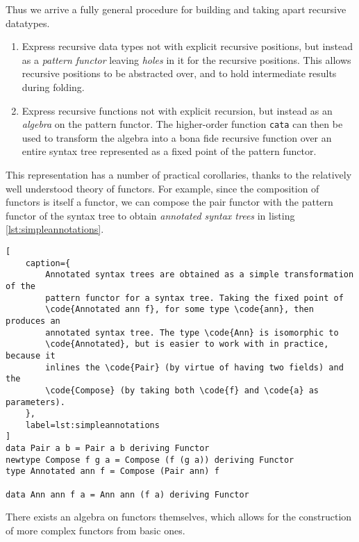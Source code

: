 \documentclass[letterpaper,11pt]{article}
\newcommand{\code}{\texttt}
\begin{document}
Thus we arrive a fully general procedure for building and taking apart
recursive datatypes.

\begin{enumerate}
    \item
        Express recursive data types not with explicit recursive positions, but
        instead as a \emph{pattern functor} leaving \emph{holes} in it for the
        recursive positions. This allows recursive positions to be abstracted
        over, and to hold intermediate results during folding.

    \item
        Express recursive functions not with explicit recursion, but instead as
        an \emph{algebra} on the pattern functor. The higher-order function
        \code{cata} can then be used to transform the algebra into a bona fide
        recursive function over an entire syntax tree represented as a fixed
        point of the pattern functor.
\end{enumerate}

This representation has a number of practical corollaries, thanks to the
relatively well understood theory of functors. For example, since the
composition of functors is itself a functor, we can compose the pair functor
with the pattern functor of the syntax tree to obtain \emph{annotated syntax
trees} in listing \ref{lst:simpleannotations}.

\begin{lstlisting}[
    caption={
        Annotated syntax trees are obtained as a simple transformation of the
        pattern functor for a syntax tree. Taking the fixed point of
        \code{Annotated ann f}, for some type \code{ann}, then produces an
        annotated syntax tree. The type \code{Ann} is isomorphic to
        \code{Annotated}, but is easier to work with in practice, because it
        inlines the \code{Pair} (by virtue of having two fields) and the
        \code{Compose} (by taking both \code{f} and \code{a} as parameters).
    },
    label=lst:simpleannotations
]
data Pair a b = Pair a b deriving Functor
newtype Compose f g a = Compose (f (g a)) deriving Functor
type Annotated ann f = Compose (Pair ann) f

data Ann ann f a = Ann ann (f a) deriving Functor
\end{lstlisting}

There exists an algebra on functors themselves, which allows for the
construction of more complex functors from basic ones.
\end{document}
